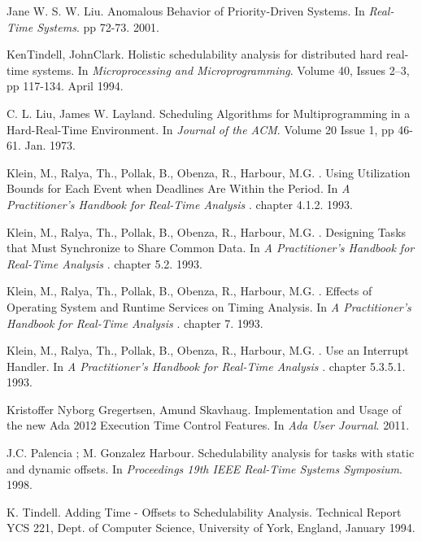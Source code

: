 \documentclass{article}
\begin{document}
\begin{thebibliography}{1}
Jane W. S. W. Liu.
\newblock Anomalous Behavior of Priority-Driven Systems.
\newblock In {\em Real-Time Systems}. pp 72-73. 2001.

KenTindell, JohnClark.
\newblock Holistic schedulability analysis for distributed hard real-time systems.
\newblock In {\em Microprocessing and Microprogramming}. Volume 40, Issues 2–3, pp 117-134. April 1994.

C. L. Liu, James W. Layland.
\newblock Scheduling Algorithms for Multiprogramming in a Hard-Real-Time Environment.
\newblock In {\em Journal of the ACM}. Volume 20 Issue 1, pp 46-61. Jan. 1973.

Klein, M., Ralya, Th., Pollak, B., Obenza, R., Harbour, M.G. .
\newblock Using Utilization Bounds for Each Event when Deadlines Are Within the Period.
\newblock In {\em A Practitioner’s Handbook for Real-Time Analysis
}. chapter 4.1.2. 1993.

Klein, M., Ralya, Th., Pollak, B., Obenza, R., Harbour, M.G. .
\newblock Designing Tasks that Must Synchronize to Share Common Data.
\newblock In {\em A Practitioner’s Handbook for Real-Time Analysis
}. chapter 5.2. 1993.

Klein, M., Ralya, Th., Pollak, B., Obenza, R., Harbour, M.G. .
\newblock Effects of Operating System and Runtime Services on Timing Analysis.
\newblock In {\em A Practitioner’s Handbook for Real-Time Analysis
}. chapter 7. 1993.

Klein, M., Ralya, Th., Pollak, B., Obenza, R., Harbour, M.G. .
\newblock Use an Interrupt Handler.
\newblock In {\em A Practitioner’s Handbook for Real-Time Analysis
}. chapter 5.3.5.1. 1993.

Kristoffer Nyborg Gregertsen, Amund Skavhaug.
\newblock Implementation and Usage of the new Ada 2012 Execution Time Control Features.
\newblock In {\em Ada User Journal}. 2011.

J.C. Palencia ; M. Gonzalez Harbour.
\newblock Schedulability analysis for tasks with static and dynamic offsets.
\newblock In {\em Proceedings 19th IEEE Real-Time Systems Symposium}. 1998.

K. Tindell.
\newblock Adding Time - Offsets to Schedulability Analysis.
\newblock Technical Report YCS 221, Dept. of Computer Science, University of York, England, January 1994.

\end{thebibliography}
\end{document}
